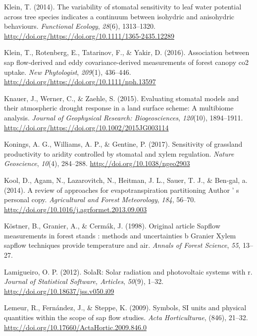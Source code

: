 \documentclass[11pt,twoside]{reedthesis}
\begin{document}
\hypertarget{ref-Klein2014}{}
Klein, T. (2014). The variability of stomatal sensitivity to leaf water
potential across tree species indicates a continuum between isohydric
and anisohydric behaviours. \emph{Functional Ecology}, \emph{28}(6),
1313--1320. \url{http://doi.org/https://doi.org/10.1111/1365-2435.12289}

\hypertarget{ref-Klein2016}{}
Klein, T., Rotenberg, E., Tatarinov, F., \& Yakir, D. (2016).
Association between sap flow-derived and eddy covariance-derived
measurements of forest canopy co2 uptake. \emph{New Phytologist},
\emph{209}(1), 436--446.
\url{http://doi.org/https://doi.org/10.1111/nph.13597}

\hypertarget{ref-Knauer2015}{}
Knauer, J., Werner, C., \& Zaehle, S. (2015). Evaluating stomatal models
and their atmospheric drought response in a land surface scheme: A
multibiome analysis. \emph{Journal of Geophysical Research:
Biogeosciences}, \emph{120}(10), 1894--1911.
\url{http://doi.org/https://doi.org/10.1002/2015JG003114}

\hypertarget{ref-Konings2017}{}
Konings, A. G., Williams, A. P., \& Gentine, P. (2017). Sensitivity of
grassland productivity to aridity controlled by stomatal and xylem
regulation. \emph{Nature Geoscience}, \emph{10}(4), 284--288.
\url{http://doi.org/10.1038/ngeo2903}

\hypertarget{ref-Kool2014}{}
Kool, D., Agam, N., Lazarovitch, N., Heitman, J. L., Sauer, T. J., \&
Ben-gal, a. (2014). A review of approaches for evapotranspiration
partitioning Author ' s personal copy. \emph{Agricultural and Forest
Meteorology}, \emph{184}, 56--70.
\url{http://doi.org/10.1016/j.agrformet.2013.09.003}

\hypertarget{ref-Kostner1998}{}
Köstner, B., Granier, A., \& Cermák, J. (1998). Original article Sapflow
measurements in forest stands : methods and uncertainties b Granier
Xylem sapflow techniques provide temperature and air. \emph{Annals of
Forest Science}, \emph{55}, 13--27.

\hypertarget{ref-perpinan2012}{}
Lamigueiro, O. P. (2012). SolaR: Solar radiation and photovoltaic
systems with r. \emph{Journal of Statistical Software, Articles},
\emph{50}(9), 1--32. \url{http://doi.org/10.18637/jss.v050.i09}

\hypertarget{ref-lemeur2009}{}
Lemeur, R., Fernández, J., \& Steppe, K. (2009). Symbols, SI units and
physical quantities within the scope of sap flow studies. \emph{Acta
Horticulturae}, (846), 21--32.
\url{http://doi.org/10.17660/ActaHortic.2009.846.0}
\end{document}
